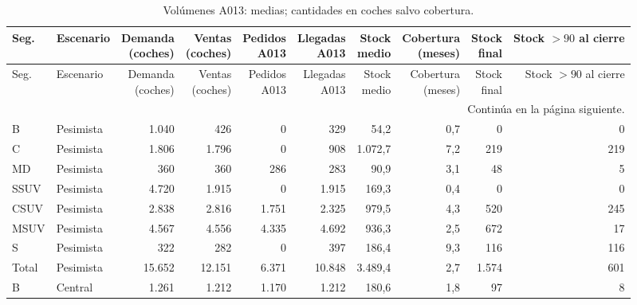 \begin{longtable}{@{}llrrrrrrrr@{}}
\caption{Volúmenes A013: medias; cantidades en coches salvo cobertura.}\label{tab:anexo-volumenes}\\
\toprule
Seg. & Escenario & \makecell{Demanda\\(coches)} & \makecell{Ventas\\(coches)} & \makecell{Pedidos\\A013} & \makecell{Llegadas\\A013} & \makecell{Stock\\medio} & \makecell{Cobertura\\(meses)} & \makecell{Stock\\final} & \makecell{Stock $>90$\\al cierre} \\
\midrule
\endfirsthead
\toprule
Seg. & Escenario & \makecell{Demanda\\(coches)} & \makecell{Ventas\\(coches)} & \makecell{Pedidos\\A013} & \makecell{Llegadas\\A013} & \makecell{Stock\\medio} & \makecell{Cobertura\\(meses)} & \makecell{Stock\\final} & \makecell{Stock $>90$\\al cierre} \\
\midrule
\endhead
\midrule
\multicolumn{10}{r}{\footnotesize Continúa en la página siguiente.}\\
\endfoot
\bottomrule
\endlastfoot
B & Pesimista & 1.040 & 426 & 0 & 329 & 54,2 & 0,7 & 0 & 0 \\
C & Pesimista & 1.806 & 1.796 & 0 & 908 & 1.072,7 & 7,2 & 219 & 219 \\
MD & Pesimista & 360 & 360 & 286 & 283 & 90,9 & 3,1 & 48 & 5 \\
SSUV & Pesimista & 4.720 & 1.915 & 0 & 1.915 & 169,3 & 0,4 & 0 & 0 \\
CSUV & Pesimista & 2.838 & 2.816 & 1.751 & 2.325 & 979,5 & 4,3 & 520 & 245 \\
MSUV & Pesimista & 4.567 & 4.556 & 4.335 & 4.692 & 936,3 & 2,5 & 672 & 17 \\
S & Pesimista & 322 & 282 & 0 & 397 & 186,4 & 9,3 & 116 & 116 \\
\rowcolor{fondo}
Total & Pesimista & 15.652 & 12.151 & 6.371 & 10.848 & 3.489,4 & 2,7 & 1.574 & 601 \\
\addlinespace[5pt]
B & Central & 1.261 & 1.212 & 1.170 & 1.212 & 180,6 & 1,8 & 97 & 8 \\

\end{longtable}
